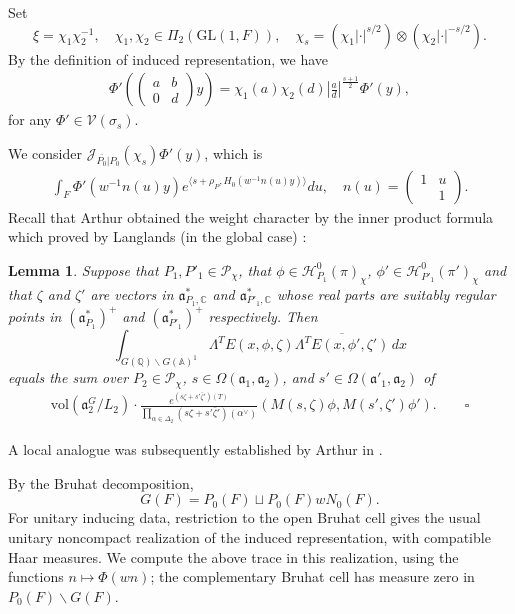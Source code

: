 \documentclass[11pt]{amsart}
\newtheorem {lemma}      [theorem]    {Lemma}
\newcommand{\GGL}{\mathrm{GL}}
\theoremstyle{definition}
\numberwithin{equation}{section}
\begin{document}
	
	Set \[\xi=\chi_1\chi_2^{-1},\quad \chi_1,\chi_2\in\Pi_2(\GGL(1,F)),\quad \chi_s = (\chi_1 |\cdot|^{s/2}) \otimes (\chi_2 |\cdot|^{-s/2}).\]By the definition of induced representation, we have
	\begin{align}\label{ind}
		\Phi' \left( \begin{pmatrix} a & b \\ 0 & d \end{pmatrix} y \right) = \chi_1(a)\chi_2(d) \left| \frac{a}{d} \right|^{\frac{s+1}{2}} \Phi'(y),
	\end{align}
	for any \(\Phi'\in \mathscr{V}(\sigma_s)\).
	
	
	We consider \(\mathscr{J}_{\overline{P_0}|P_0}(\chi_s)\Phi'(y)\), which is
	\begin{align*}
		\int_{F} \Phi'(w^{-1}n(u)y) e^{\langle s+ \rho_P, H_0(w^{-1}n(u)y) \rangle} du,\quad n(u)=\left(\begin{matrix}
			1&u\\
			&1
		\end{matrix}\right).
	\end{align*}
	Recall that Arthur obtained the weight character by the inner product formula which proved by Langlands (in the global case) :
	\begin{lemma}\cite{Art80}
		Suppose that \(P_1, P'_1 \in \mathcal{P}_\chi\), that \(\phi \in \mathcal{H}^0_{P_1}(\pi)_\chi\), \(\phi' \in \mathcal{H}^0_{P'_1}(\pi')_\chi\) and that \(\zeta\) and \(\zeta'\) are vectors in \(\mathfrak{a}^*_{P_1,\mathbb{C}}\) and \(\mathfrak{a}^*_{P'_1,\mathbb{C}}\) whose real parts are suitably regular points in \((\mathfrak{a}^*_{P_1})^+\) and \((\mathfrak{a}^*_{P'_1})^+\) respectively. Then
		\[
		\int_{G(\mathbb{Q})\backslash G(\mathbb{A})^1} \Lambda^T E(x, \phi, \zeta) \overline{\Lambda^T E(x, \phi', \zeta')} \, dx
		\]
		equals the sum over \(P_2 \in \mathcal{P}_\chi\), \(s \in \Omega(\mathfrak{a}_1, \mathfrak{a}_2)\), and \(s' \in \Omega(\mathfrak{a}'_1, \mathfrak{a}_2)\) of
		\begin{align}\label{inner}
			\mathrm{vol}(\mathfrak{a}_2^G/L_2) \cdot \frac{e^{(s\zeta + s'\bar{\zeta}')(T)}}{\prod_{\alpha \in \Delta_2} (s\zeta + s'\bar{\zeta}')(\alpha^\vee)} (M(s, \zeta)\phi, M(s', \zeta')\phi'). \qquad \square
		\end{align}
	\end{lemma}
    A local analogue was subsequently established by Arthur in \cite{Art91}.

    
	By the Bruhat decomposition,
\[
G(F)=P_0(F)\sqcup P_0(F)wN_0(F).
\]
For unitary inducing data, restriction to the open
Bruhat cell gives the usual unitary noncompact
realization of the induced representation, with
compatible Haar measures. We compute the above trace
in this realization, using the functions
$n\mapsto\Phi(wn)$; the complementary Bruhat cell has
measure zero in $P_0(F)\backslash G(F)$.
	
\end{document}
